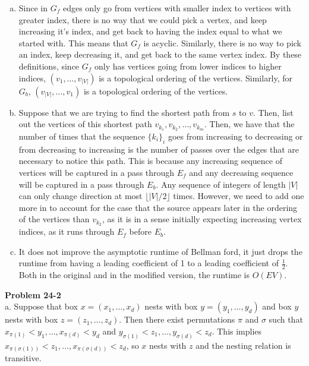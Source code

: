 \documentclass{article}
\begin{document}
\begin{enumerate}[a.]
\item
Since in $G_f$ edges only go from vertices with smaller index to vertices with greater index, there is no way that we could pick a vertex, and keep increasing it's index, and get back to having the index equal to what we started with. This means that $G_f$ is acyclic. Similarly, there is no way to pick an index, keep decreasing it, and get back to the same vertex index. By these definitions, since $G_f$ only has vertices going from lower indices to higher indices, $(v_1, \ldots,v_{|V|})$ is a topological ordering of the vertices. Similarly, for $G_b$, $(v_{|V|},\ldots,v_1)$ is a topological ordering of the vertices.

\item
Suppose that we are trying to find the shortest path from $s$ to $v$. Then, list out the vertices of this shortest path $v_{k_1}, v_{k_2}, \ldots, v_{k_m}$. Then, we have that the number of times that the sequence $\{k_i\}_i$ goes from increasing to decreasing or from decreasing to increasing is the number of passes over the edges that are necessary to notice this path. This is because any increasing sequence of vertices will be captured in a pass through $E_f$ and any decreasing sequence will be captured in a pass through $E_b$. Any sequence of integers of length $|V|$ can only change direction at most $\lfloor |V|/2\rfloor$ times. However, we need to add one more in to account for the case that the source appears later in the ordering of the vertices than $v_{k_2}$, as it is in a sense initially expecting increasing vertex indices, as it runs through $E_f$ before $E_b$.

\item
It does not improve the asymptotic runtime of Bellman ford, it just drops the runtime from having a leading coefficient of 1 to a leading coefficient of $\frac{1}{2}$. Both in the original and in the modified version, the runtime is $O(EV)$.
\end{enumerate}

\noindent\textbf{Problem 24-2}\\

a. Suppose that box $x = (x_1, \ldots, x_d)$ nests with box $y = (y_1, \ldots, y_d)$ and box $y$ nests with box $z = (z_1, \ldots, z_d)$.  Then there exist permutations $\pi$ and $\sigma$ such that $x_{\pi(1)} < y_1, \ldots, x_{\pi(d)} < y_d$ and $y_{\sigma(1)} < z_1, \ldots, y_{\sigma(d)} < z_d$.  This implies $x_{\pi(\sigma(1))} < z_1, \ldots, x_{\pi(\sigma(d))} < z_d$, so $x$ nests with $z$ and the nesting relation is transitive. \\
\end{document}
